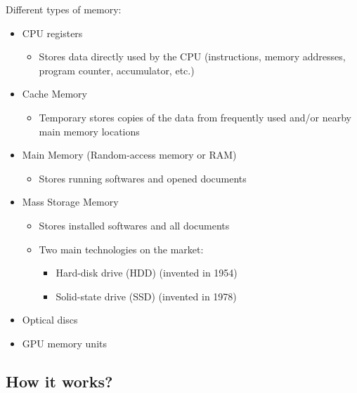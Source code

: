 \documentclass[handout]{beamer}[10pt, usepdftitle=false]
\begin{document}
	\begin{frame}

	Different types of memory:
	\begin{itemize}
	\item {CPU registers
		\begin{itemize}
			\item{Stores data directly used by the CPU (instructions, memory addresses, program counter, accumulator, etc.)}
		\end{itemize}			
	}
	\item {Cache Memory
		\begin{itemize}
			\item{Temporary stores copies of the data from frequently used and/or nearby main memory locations}
		\end{itemize}			
	}
	\item {Main Memory (Random-access memory or RAM)
		\begin{itemize}
			\item {Stores running softwares and opened documents}	
		\end{itemize}			
	}
	\item {Mass Storage Memory 
		\begin{itemize}
			\item {Stores installed softwares and all documents}
			\item {Two main technologies on the market: 
				\begin{itemize}
					\item {Hard-disk drive (HDD) (invented in 1954)}
					\item {Solid-state drive (SSD) (invented in 1978)}
				\end{itemize}
			}
		\end{itemize}			
	}
	\item {Optical discs}
	\item {GPU memory units}	
	\end{itemize}
	
	\end{frame}


\subsection{How it works?}
\end{document}
